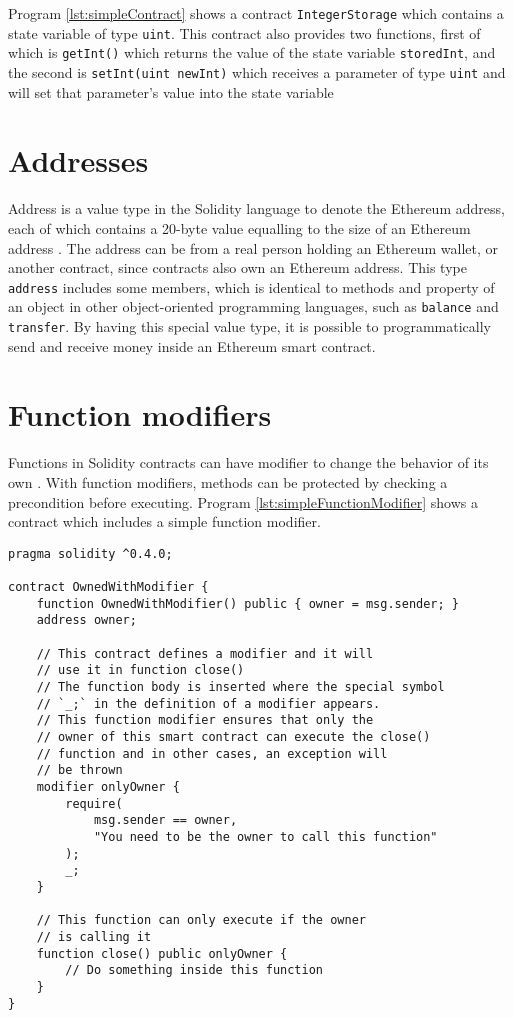 Program \ref{lst:simpleContract} shows a contract \texttt{IntegerStorage} which contains a state variable of type \texttt{uint}. This contract also provides two functions, first of which is \texttt{getInt()} which returns the value of the state variable \texttt{storedInt}, and the second is \texttt{setInt(uint newInt)} which receives a parameter of type \texttt{uint} and will set that parameter's value into the state variable

\section{Addresses}

Address is a value type in the Solidity language to denote the Ethereum address, each of which contains a 20-byte value equalling to the size of an Ethereum address \citep{SolidityDocumentation}. The address can be from a real person holding an Ethereum wallet, or another contract, since contracts also own an Ethereum address. This type \texttt{address} includes some members, which is identical to methods and property of an object in other object-oriented programming languages, such as \texttt{balance} and \texttt{transfer}. By having this special value type, it is possible to programmatically send and receive money inside an Ethereum smart contract.

\section{Function modifiers}
\label{section:functionModifiers}

Functions in Solidity contracts can have modifier to change the behavior of its own \citep{SolidityDocumentation}. With function modifiers, methods can be protected by checking a precondition before executing. Program \ref{lst:simpleFunctionModifier} shows a contract which includes a simple function modifier.

\begin{lstlisting}[float,caption={Simple function modifier in a contract \citep{SolidityDocumentation}.},label={lst:simpleFunctionModifier},language=Solidity,float=h,floatplacement=h]
pragma solidity ^0.4.0;

contract OwnedWithModifier {
    function OwnedWithModifier() public { owner = msg.sender; }
    address owner;

    // This contract defines a modifier and it will
    // use it in function close()
    // The function body is inserted where the special symbol
    // `_;` in the definition of a modifier appears.
    // This function modifier ensures that only the
    // owner of this smart contract can execute the close()
    // function and in other cases, an exception will
    // be thrown
    modifier onlyOwner {
        require(
            msg.sender == owner,
            "You need to be the owner to call this function"
        );
        _;
    }
    
    // This function can only execute if the owner
    // is calling it
    function close() public onlyOwner {
        // Do something inside this function
    }
}
\end{lstlisting}

